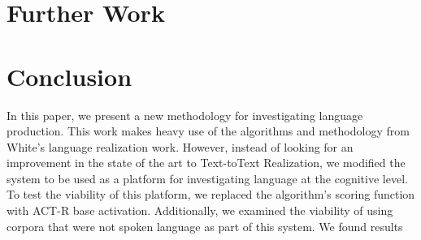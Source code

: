 \documentclass[11pt]{article}
\begin{document}
  
\section{Further Work}



\section{Conclusion}
In this paper, we present a new methodology for investigating language production. This work makes heavy use of the algorithms and methodology from White's language realization work. However, instead of looking for an improvement in the state of the art to Text-toText Realization, we modified the system to be used as a platform for investigating language at the cognitive level. To test the viability of this platform, we replaced the algorithm's scoring function with ACT-R base activation. Additionally, we examined the viability of using corpora that were not spoken language as part of this system. We found results 

\printbibliography
\end{document}
